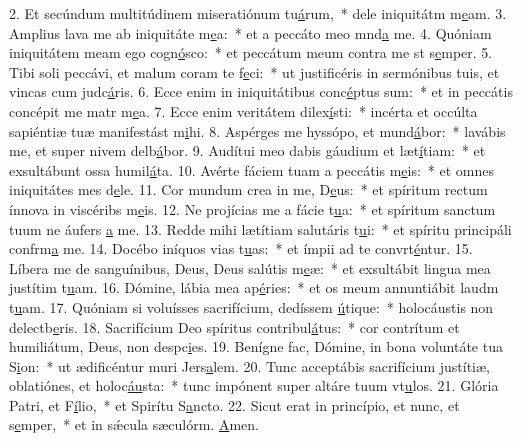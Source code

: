 2. Et secúndum multitúdinem miseratiónum tu\uline{á}rum,~* dele iniquitátm m\uline{e}am.
3. Amplius lava me ab iniquitáte m\uline{e}a:~* et a peccáto meo mnd\uline{a} me.
4. Quóniam iniquitátem meam ego cogn\uline{ó}sco:~* et peccátum meum contra me st s\uline{e}mper.
5. Tibi soli peccávi, et malum coram te f\uline{e}ci:~* ut justificéris in sermónibus tuis, et vincas cum judc\uline{á}ris.
6. Ecce enim in iniquitátibus conc\uline{é}ptus sum:~* et in peccátis concépit me matr m\uline{e}a.
7. Ecce enim veritátem dilex\uline{í}sti:~* incérta et occúlta sapiéntiæ tuæ manifestást m\uline{i}hi.
8. Aspérges me hyssópo, et mund\uline{á}bor:~* lavábis me, et super nivem delb\uline{á}bor.
9. Audítui meo dabis gáudium et læt\uline{í}tiam:~* et exsultábunt ossa humil\uline{á}ta.
10. Avérte fáciem tuam a peccátis m\uline{e}is:~* et omnes iniquitátes mes d\uline{e}le.
11. Cor mundum crea in me, D\uline{e}us:~* et spíritum rectum ínnova in viscéribs m\uline{e}is.
12. Ne projícias me a fácie t\uline{u}a:~* et spíritum sanctum tuum ne áufers \uline{a} me.
13. Redde mihi lætítiam salutáris t\uline{u}i:~* et spíritu principáli confrm\uline{a} me.
14. Docébo iníquos vias t\uline{u}as:~* et ímpii ad te convrt\uline{é}ntur.
15. Líbera me de sanguínibus, Deus, Deus salútis m\uline{e}æ:~* et exsultábit lingua mea justítim t\uline{u}am.
16. Dómine, lábia mea ap\uline{é}ries:~* et os meum annuntiábit laudm t\uline{u}am.
17. Quóniam si voluísses sacrifícium, dedíssem \uline{ú}tique:~* holocáustis non delectb\uline{e}ris.
18. Sacrifícium Deo spíritus contribul\uline{á}tus:~* cor contrítum et humiliátum, Deus, non despc\uline{i}es.
19. Benígne fac, Dómine, in bona voluntáte tua S\uline{i}on:~* ut ædificéntur muri Jers\uline{a}lem.
20. Tunc acceptábis sacrifícium justítiæ, oblatiónes, et holoc\uline{áu}sta:~* tunc impónent super altáre tuum vt\uline{u}los.
21. Glória Patri, et F\uline{í}lio,~* et Spirítu S\uline{a}ncto.
22. Sicut erat in princípio, et nunc, et s\uline{e}mper,~* et in sǽcula sæculórm. \uline{A}men.
